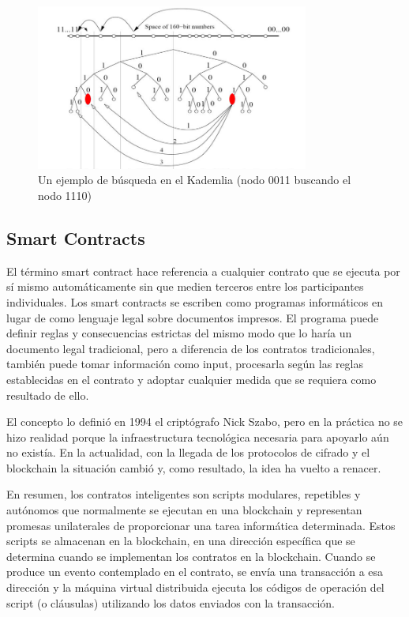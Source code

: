 \begin{figure}[htbp!] 
\centering    
\includegraphics[width=0.8\textwidth]{kademlia-search}
\caption[KademliaSearch]{Un ejemplo de búsqueda en el Kademlia (nodo 0011 buscando el nodo 1110)}
\label{fig:kademlia-search}
\end{figure}

\subsection{Smart Contracts}
El término smart contract hace referencia a cualquier contrato que se ejecuta por sí mismo
automáticamente sin que medien terceros entre los participantes individuales. Los smart contracts
se escriben como programas informáticos en lugar de como lenguaje legal sobre documentos impresos.
El programa puede definir reglas y consecuencias estrictas del mismo modo que lo haría un documento
legal tradicional, pero a diferencia de los contratos tradicionales, también puede tomar
información como input, procesarla según las reglas establecidas en el contrato y adoptar cualquier
medida que se requiera como resultado de ello.

El concepto lo definió en 1994 el criptógrafo Nick Szabo, pero en la práctica no se hizo realidad
porque la infraestructura tecnológica necesaria para apoyarlo aún no existía. En la actualidad, con
la llegada de los protocolos de cifrado y el blockchain la situación cambió y, como resultado, la
idea ha vuelto a renacer.

En resumen, los contratos inteligentes son scripts modulares, repetibles y autónomos que
normalmente se ejecutan en una blockchain y representan promesas unilaterales de proporcionar una
tarea informática determinada. Estos scripts se almacenan en la blockchain, en una dirección
específica que se determina cuando se implementan los contratos en la blockchain. Cuando se produce
un evento contemplado en el contrato, se envía una transacción a esa dirección y la máquina virtual
distribuida ejecuta los códigos de operación del script (o cláusulas) utilizando los datos enviados
con la transacción.

